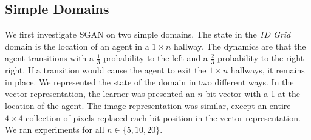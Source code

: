 \documentclass[letterpaper]{article} %
\begin{document}
\subsection{Simple Domains}

\begin{table}\renewcommand{\arraystretch}{1.1} 
\centering
{}
\caption{Results on Simple Domains.}
\label{table-simple}
\end{table}
\vspace{-0.2em}

We first investigate SGAN on two simple domains. The state in the \emph{1D Grid} domain is the location of an agent in a $1\times n$ hallway. The dynamics are that the agent transitions with a $\frac{1}{3}$ probability to the left and a $\frac{2}{3}$ probability to the right right. If a transition would cause the agent to exit the $1\times n$ hallways, it remains in place. We represented the state of the domain in two different ways. In the vector representation, the learner was presented an $n$-bit vector with a 1 at the location of the agent. The image representation was similar, except an entire $4\times 4$ collection of pixels replaced each bit position in the vector representation. We ran experiments for all $n \in \{5, 10, 20\}$.
\end{document}
